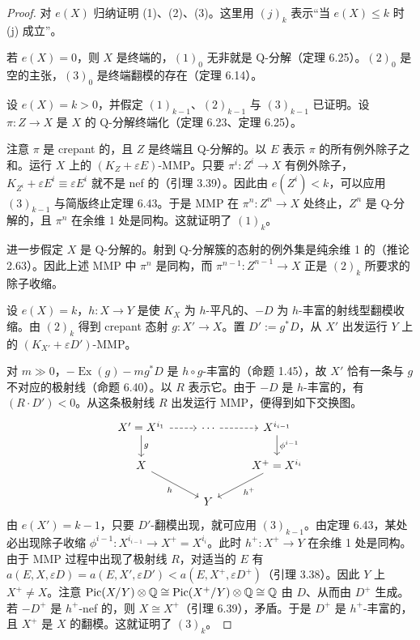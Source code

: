 \begin{proof}
对 $e(X)$ 归纳证明 (1)、(2)、(3)。这里用 $(j)_k$ 表示“当 $e(X)\le k$ 时 (j) 成立”。

若 $e(X)=0$，则 $X$ 是终端的，$(1)_0$ 无非就是 Q-分解（定理 6.25）。$(2)_0$ 是空的主张，$(3)_0$ 是终端翻模的存在（定理 6.14）。

设 $e(X)=k>0$，并假定 $(1)_{k-1}$、$(2)_{k-1}$ 与 $(3)_{k-1}$ 已证明。设 $\pi:Z\to X$ 是 $X$ 的 Q-分解终端化（定理 6.23、定理 6.25）。

注意 $\pi$ 是 crepant 的，且 $Z$ 是终端且 Q-分解的。以 $E$ 表示 $\pi$ 的所有例外除子之和。运行 $X$ 上的 $(K_Z+\varepsilon E)$-MMP。只要 $\pi^i:Z^i\to X$ 有例外除子，$K_{Z^i}+\varepsilon E^i\equiv\varepsilon E^i$ 就不是 nef 的（引理 3.39）。因此由 $e(Z^i)<k$，可以应用 $(3)_{k-1}$ 与简版终止定理 6.43。于是 MMP 在 $\pi^n:Z^n\to X$ 处终止，$Z^n$ 是 Q-分解的，且 $\pi^n$ 在余维 1 处是同构。这就证明了 $(1)_k$。

进一步假定 $X$ 是 Q-分解的。射到 Q-分解簇的态射的例外集是纯余维 1 的（推论 2.63）。因此上述 MMP 中 $\pi^n$ 是同构，而 $\pi^{n-1}:Z^{n-1}\to X$ 正是 $(2)_k$ 所要求的除子收缩。

设 $e(X)=k$，$h:X\to Y$ 是使 $K_X$ 为 $h$-平凡的、$-D$ 为 $h$-丰富的射线型翻模收缩。由 $(2)_k$ 得到 crepant 态射 $g:X'\to X$。置 $D':=g^*D$，从 $X'$ 出发运行 $Y$ 上的 $(K_{X'}+\varepsilon D')$-MMP。

对 $m\gg0$，$-\operatorname{Ex}(g)-mg^*D$ 是 $h\circ g$-丰富的（命题 1.45），故 $X'$ 恰有一条与 $g$ 不对应的极射线（命题 6.40）。以 $R$ 表示它。由于 $-D$ 是 $h$-丰富的，有 $(R\cdot D')<0$。从这条极射线 $R$ 出发运行 MMP，便得到如下交换图。
\[
\begin{tikzcd}
X'=X^{i_1} \arrow[r,dashed] \arrow[d,"g"] & \cdots \arrow[r,dashed] & X^{i_{i-1}} \arrow[d,"\phi^{i-1}"] \\
X \arrow[dr,"h"'] & & X^+=X^{i_i} \arrow[dl,"h^+"] \\
& Y &
\end{tikzcd}
\]
由 $e(X')=k-1$，只要 $D'$-翻模出现，就可应用 $(3)_{k-1}$。由定理 6.43，某处必出现除子收缩 $\phi^{i-1}:X^{i_{i-1}}\to X^+=X^{i_i}$。此时 $h^+:X^+\to Y$ 在余维 1 处是同构。由于 MMP 过程中出现了极射线 $R$，对适当的 $E$ 有 $a(E,X,\varepsilon D)=a(E,X',\varepsilon D')<a(E,X^+,\varepsilon D^+)$（引理 3.38）。因此 $Y$ 上 $X^+\ne X$。注意 $\operatorname{Pic}(X/Y)\otimes\mathbb{Q}\cong\operatorname{Pic}(X^+/Y)\otimes\mathbb{Q}\cong\mathbb{Q}$ 由 $D$、从而由 $D^+$ 生成。若 $-D^+$ 是 $h^+$-nef 的，则 $X\cong X^+$（引理 6.39），矛盾。于是 $D^+$ 是 $h^+$-丰富的，且 $X^+$ 是 $X$ 的翻模。这就证明了 $(3)_k$。
\end{proof}

